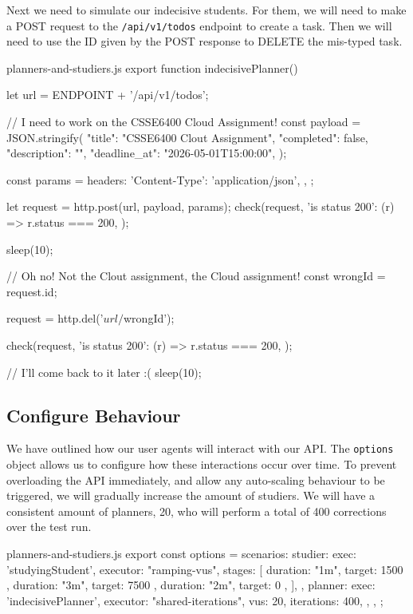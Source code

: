 \documentclass{csse4400}
\begin{document}

Next we need to simulate our indecisive students.
For them, we will need to make a POST request to the \texttt{/api/v1/todos} endpoint to create a task.
Then we will need to use the ID given by the POST response to DELETE the mis-typed task.
%
\begin{code}[language=JavaScript,numbers=none]{planners-and-studiers.js}
export function indecisivePlanner() {
    let url = ENDPOINT + '/api/v1/todos';

    // I need to work on the CSSE6400 Cloud Assignment!
    const payload = JSON.stringify({
        "title": "CSSE6400 Clout Assignment",
        "completed": false,
        "description": "",
        "deadline_at": "2026-05-01T15:00:00",
    });

    const params = {
        headers: {
            'Content-Type': 'application/json',
        },
    };

    let request = http.post(url, payload, params);
    check(request, {
        'is status 200': (r) => r.status === 200,
    });

    sleep(10);

    // Oh no! Not the Clout assignment, the Cloud assignment!
    const wrongId = request.id;

    request = http.del('${url}/${wrongId}');

    check(request, {
        'is status 200': (r) => r.status === 200,
    });

    // I'll come back to it later :(
    sleep(10);
}
\end{code}

\subsection{Configure Behaviour}

We have outlined how our user agents will interact with our API.
The \texttt{options} object allows us to configure how these interactions occur over time.
To prevent overloading the API immediately,
and allow any auto-scaling behaviour to be triggered,
we will gradually increase the amount of studiers.
We will have a consistent amount of planners, 20,
who will perform a total of 400 corrections over the test run.
%
\begin{code}[language=JavaScript,numbers=none]{planners-and-studiers.js}
export const options = {
    scenarios: {
        studier: {
            exec: 'studyingStudent',
            executor: "ramping-vus",
            stages: [
                { duration: "1m", target: 1500 },
                { duration: "3m", target: 7500 },
                { duration: "2m", target: 0 },
            ],
        },
        planner: {
            exec: 'indecisivePlanner',
            executor: "shared-iterations",
            vus: 20,
            iterations: 400,
        },
    },
};
\end{code}
\end{document}
